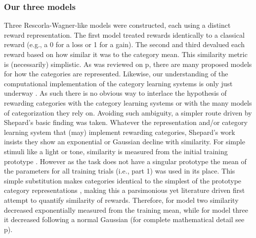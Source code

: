 \subsubsection{Our three models}
\label{subsub:catquant}
Three Rescorla-Wagner-like models were constructed, each using a distinct reward representation.  The first model treated rewards identically to a classical reward (e.g., a 0 for a loss or 1 for a gain).  The second and third devalued each reward based on how similar it was to the category mean.  This similarity metric is (necessarily) simplistic.  As was reviewed on p\pageref{subsub:curves}, there are many proposed models for how the categories are represented.  Likewise, our understanding of the computational implementation of the category learning systems is only just underway \citep{Ashby:2005p9152,Ashby:2006p9153}.  As such there is no obvious way to interlace the hypothesis of rewarding categories with the category learning systems or with the many models of categorization they rely on.  Avoiding such ambiguity, a simpler route driven by Shepard's basic finding \citep{Shepard:1987p9102} was taken.  Whatever the representation and/or category learning system that (may) implement rewarding categories, Shepard's work insists they show an exponential or Gaussian decline with similarity.  For simple stimuli like a light or tone, similarity is measured from the initial training prototype \citep{Guttman:1956p8355}.  However as the task does not have a singular prototype the mean of the parameters for all training trials (i.e., part 1) was used in its place.  This simple substitution makes categories identical to the simplest of the prototype category representations \citep{Rosch:1973p9108,Ashby:1995p9109}, making this a parsimonious yet literature driven first attempt to quantify similarity of rewards.  Therefore, for model two similarity decreased exponentially measured from the training mean, while for model three it decreased following a normal Gaussian (for complete mathematical detail see p\pageref{subsub:codesandfits}).  

